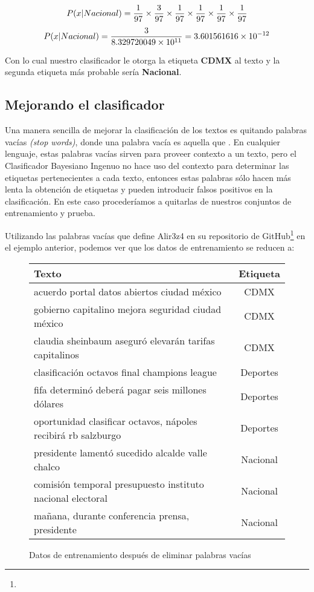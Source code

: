 \[ P(x | Nacional) = {1 \over 97} \times {3 \over 97} \times {1 \over 97} \times {1 \over 97} \times {1 \over 97} \times {1 \over 97} \]
\[ P(x | Nacional) = { 3 \over 8.329720049\times10^{11} } = 3.601561616\times10^{-12} \]


Con lo cual nuestro clasificador le otorga la etiqueta \textbf{CDMX} al texto  y la segunda etiqueta más probable sería \textbf{Nacional}.


\subsection{Mejorando el clasificador}

Una manera sencilla de mejorar la clasificación de los textos es quitando palabras vacías \textit{(stop words)}, donde una palabra vacía es aquella que \parencite[533]{ManningSchutze1999}. En cualquier lenguaje, estas palabras vacías sirven para proveer contexto a un texto, pero el Clasificador Bayesiano Ingenuo no hace uso del contexto para determinar las etiquetas pertenecientes a cada texto, entonces estas palabras sólo hacen más lenta la obtención de etiquetas y pueden introducir falsos positivos en la clasificación. En este caso procederíamos a quitarlas de nuestros conjuntos de entrenamiento y prueba.

Utilizando las palabras vacías que define Alir3z4 en su repositorio de GitHub\footnote{} en el ejemplo anterior, podemos ver que los datos de entrenamiento se reducen a:

\begin{figure}[H]
  \begin{center}
    \begin{tabular}{ l | c }
      Texto & Etiqueta \\ \hline
      acuerdo portal datos abiertos ciudad méxico & CDMX  \\ \hline
      gobierno capitalino mejora seguridad ciudad méxico & CDMX  \\ \hline
      claudia sheinbaum aseguró elevarán tarifas capitalinos & CDMX  \\ \hline
      clasificación octavos final champions league & Deportes\\ \hline
      fifa determinó deberá pagar seis millones dólares & Deportes  \\ \hline
      oportunidad clasificar octavos, nápoles recibirá rb salzburgo & Deportes  \\ \hline
      presidente lamentó sucedido alcalde valle chalco & Nacional  \\ \hline
      comisión temporal presupuesto instituto nacional electoral & Nacional  \\ \hline
      mañana, durante conferencia prensa, presidente & Nacional  \\
    \end{tabular}
  \end{center}
  \caption{Datos de entrenamiento después de eliminar palabras vacías}
\end{figure}

